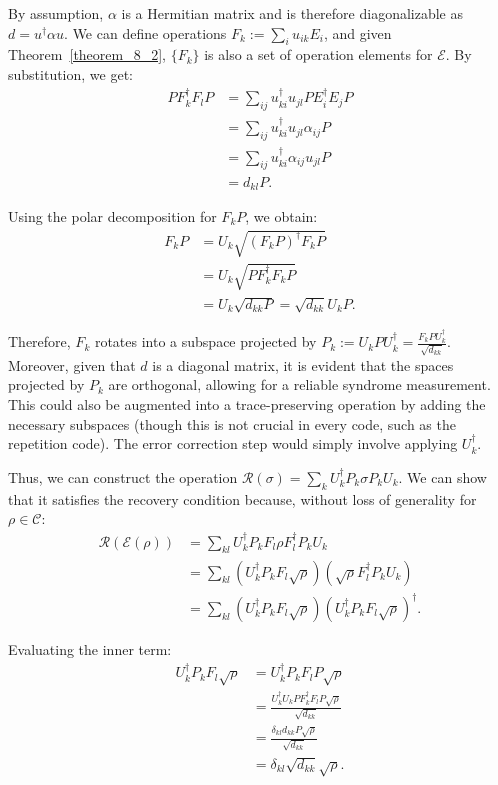 By assumption, $\alpha$ is a Hermitian matrix and is therefore diagonalizable as $d = u^\dagger \alpha u$. We can define operations $F_k := \sum_{i} u_{ik} E_i$, and given Theorem~\ref{theorem_8_2}, $\{F_k\}$ is also a set of operation elements for $\mathcal{E}$. By substitution, we get:
\begin{align*}
P F^{\dagger}_k F_l P &= \sum_{ij} u_{ki}^\dagger u_{jl} P E_i^\dagger E_j P\\
&= \sum_{ij} u_{ki}^\dagger u_{jl} \alpha_{ij} P\\
&= \sum_{ij} u_{ki}^\dagger \alpha_{ij} u_{jl} P\\
&= d_{kl} P
.\end{align*}

Using the polar decomposition for $F_k P$, we obtain:
\begin{align*}
F_k P &= U_k\sqrt{(F_k P)^\dagger F_k P}\\
&= U_k\sqrt{P F_k^\dagger F_k P}\\
&= U_k\sqrt{d_{kk} P}
= \sqrt{d_{kk}} U_k P
.\end{align*}

Therefore, $F_k$ rotates into a subspace projected by $P_k := U_k P U_k^\dagger = \frac{F_k P U_k^\dagger}{\sqrt{d_{kk}}}$. Moreover, given that $d$ is a diagonal matrix, it is evident that the spaces projected by $P_k$ are orthogonal, allowing for a reliable syndrome measurement. This could also be augmented into a trace-preserving operation by adding the necessary subspaces (though this is not crucial in every code, such as the repetition code). The error correction step would simply involve applying $U^\dagger_k$.

Thus, we can construct the operation $\mathcal{R}(\sigma) = \sum_k U_k^\dagger P_k \sigma P_k U_k$. We can show that it satisfies the recovery condition because, without loss of generality for $\rho \in \mathcal{C}$:
\begin{align*}
\mathcal{R}(\mathcal{E}(\rho)) &= \sum_{kl} U_k^\dagger P_k F_l \rho F_l^\dagger P_k U_k\\
&=\sum_{kl} \left(U_k^\dagger P_k F_l \sqrt{\rho}\right) \left(\sqrt{\rho} F_l^\dagger P_k U_k\right)\\
&=\sum_{kl} \left(U_k^\dagger P_k F_l \sqrt{\rho}\right) \left(U_k^\dagger P_k F_l \sqrt{\rho}\right)^\dagger
.\end{align*}

Evaluating the inner term:
\begin{align*}
U_k^\dagger P_k F_l \sqrt{\rho} &= U_k^\dagger P_k F_l P \sqrt{\rho}\\
&= \frac{U_k^\dagger U_k P F_k^\dagger F_l P \sqrt{\rho}}{\sqrt{d_{kk}}}\\
&= \frac{\delta_{kl} d_{kk} P \sqrt{\rho}}{\sqrt{d_{kk}}}\\
&= \delta_{kl} \sqrt{d_{kk}} \sqrt{\rho}
.\end{align*}

